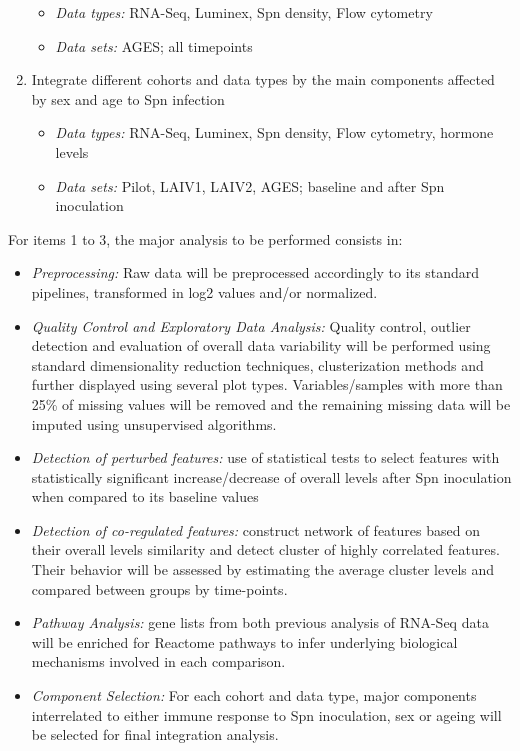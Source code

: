 \documentclass[
]{book}
\begin{document}
\begin{enumerate}
  \begin{itemize}
  \item
    \emph{Data types:} RNA-Seq, Luminex, Spn density, Flow cytometry
  \item
    \emph{Data sets:} AGES; all timepoints
  \end{itemize}
\item
  Integrate different cohorts and data types by the main components affected by sex and age to Spn infection

  \begin{itemize}
  \item
    \emph{Data types:} RNA-Seq, Luminex, Spn density, Flow cytometry, hormone levels
  \item
    \emph{Data sets:} Pilot, LAIV1, LAIV2, AGES; baseline and after Spn inoculation
  \end{itemize}
\end{enumerate}

For items 1 to 3, the major analysis to be performed consists in:

\begin{itemize}
\item
  \emph{Preprocessing:} Raw data will be preprocessed accordingly to its standard pipelines, transformed in log2 values and/or normalized.
\item
  \emph{Quality Control and Exploratory Data Analysis:} Quality control, outlier detection and evaluation of overall data variability will be performed using standard dimensionality reduction techniques, clusterization methods and further displayed using several plot types. Variables/samples with more than 25\% of missing values will be removed and the remaining missing data will be imputed using unsupervised algorithms.
\item
  \emph{Detection of perturbed features:} use of statistical tests to select features with statistically significant increase/decrease of overall levels after Spn inoculation when compared to its baseline values
\item
  \emph{Detection of co-regulated features:} construct network of features based on their overall levels similarity and detect cluster of highly correlated features. Their behavior will be assessed by estimating the average cluster levels and compared between groups by time-points.
\item
  \emph{Pathway Analysis:} gene lists from both previous analysis of RNA-Seq data will be enriched for Reactome pathways to infer underlying biological mechanisms involved in each comparison.
\item
  \emph{Component Selection:} For each cohort and data type, major components interrelated to either immune response to Spn inoculation, sex or ageing will be selected for final integration analysis.
\end{itemize}
\end{document}

